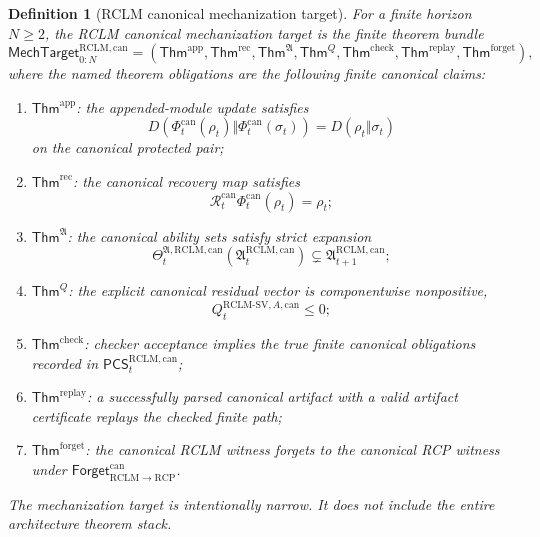 \documentclass[11pt,a4paper]{article}
\newtheorem{definition}[theorem]{Definition}
\newcommand{\RCP}{\mathrm{RCP}}
\newcommand{\RCLM}{\mathrm{RCLM}}
\begin{document}
\begin{definition}[RCLM canonical mechanization target]
\label{def:rclm-batch13rB-mechanization-target}
For a finite horizon \(N\ge2\), the RCLM canonical mechanization target is the finite theorem bundle
\[
\mathsf{MechTarget}_{0:N}^{\RCLM,\mathrm{can}}
=
(\mathsf{Thm}^{\mathrm{app}},\mathsf{Thm}^{\mathrm{rec}},
\mathsf{Thm}^{\mathfrak A},\mathsf{Thm}^{Q},
\mathsf{Thm}^{\mathrm{check}},\mathsf{Thm}^{\mathrm{replay}},
\mathsf{Thm}^{\mathrm{forget}}),
\]
where the named theorem obligations are the following finite canonical claims:
\begin{enumerate}[label=(\roman*),leftmargin=1.5em]
    \item \(\mathsf{Thm}^{\mathrm{app}}\): the appended-module update satisfies
    \[
    D(\Phi_t^{\mathrm{can}}(\rho_t)\Vert\Phi_t^{\mathrm{can}}(\sigma_t))
    =D(\rho_t\Vert\sigma_t)
    \]
    on the canonical protected pair;
    \item \(\mathsf{Thm}^{\mathrm{rec}}\): the canonical recovery map satisfies
    \[
    \mathcal R_t^{\mathrm{can}}\Phi_t^{\mathrm{can}}(\rho_t)=\rho_t;
    \]
    \item \(\mathsf{Thm}^{\mathfrak A}\): the canonical ability sets satisfy strict expansion
    \[
    \Theta_t^{\mathfrak A,\RCLM,\mathrm{can}}
    (\mathfrak A_t^{\RCLM,\mathrm{can}})
    \subsetneq
    \mathfrak A_{t+1}^{\RCLM,\mathrm{can}};
    \]
    \item \(\mathsf{Thm}^{Q}\): the explicit canonical residual vector is componentwise nonpositive,
    \[
    Q_t^{\RCLM\text{-}\mathrm{SV},A,\mathrm{can}}\le0;
    \]
    \item \(\mathsf{Thm}^{\mathrm{check}}\): checker acceptance implies the true finite canonical obligations recorded in \(\mathsf{PCS}_t^{\RCLM,\mathrm{can}}\);
    \item \(\mathsf{Thm}^{\mathrm{replay}}\): a successfully parsed canonical artifact with a valid artifact certificate replays the checked finite path;
    \item \(\mathsf{Thm}^{\mathrm{forget}}\): the canonical RCLM witness forgets to the canonical RCP witness under \(\mathsf{Forget}_{\RCLM\to\RCP}^{\mathrm{can}}\).
\end{enumerate}
The mechanization target is intentionally narrow.  It does not include the entire architecture theorem stack.
\end{definition}
\end{document}
